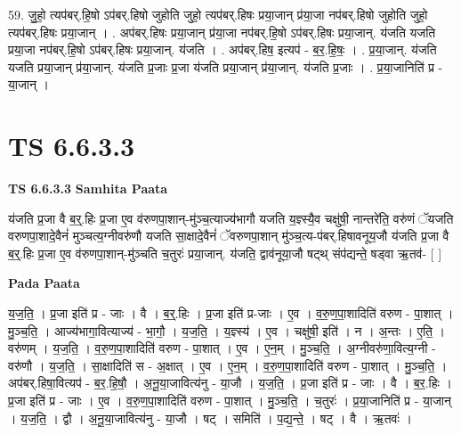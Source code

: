 \documentclass[17pt]{extarticle}
\begin{document}
59. जु॒हो॒ त्यप॑बर्.हि॒षो ऽप॑बर्.हिषो जुहोति जुहो॒ त्यप॑बर्.हिषः प्रया॒जान् प्र॑या॒जा नप॑बर्.हिषो जुहोति जुहो॒ त्यप॑बर्.हिषः प्रया॒जान् । . अप॑बर्.हिषः प्रया॒जान् प्र॑या॒जा नप॑बर्.हि॒षो ऽप॑बर्.हिषः प्रया॒जान्. य॑जति यजति प्रया॒जा नप॑बर्.हि॒षो ऽप॑बर्.हिषः प्रया॒जान्. य॑जति । . अप॑बर्.हिष॒ इत्यप॑ - ब॒र॒.हि॒षः॒ । . प्र॒या॒जान्. य॑जति यजति प्रया॒जान् प्र॑या॒जान्. य॑जति प्र॒जाः प्र॒जा य॑जति प्रया॒जान् प्र॑या॒जान्. य॑जति प्र॒जाः । . प्र॒या॒जानिति॑ प्र - या॒जान् । \newline
\pagebreak
{}

\section{ TS 6.6.3.3 }

\textbf{TS 6.6.3.3 } \newline
\textbf{Samhita Paata} \newline

य॑जति प्र॒जा वै ब॒र्॒.हिः प्र॒जा ए॒व व॑रुणपा॒शान्-मु॑ञ्च॒त्याज्य॑भागौ यजति य॒ज्ञ्स्यै॒व चक्षु॑षी॒ नान्तरे॑ति॒ वरु॑णं ॅयजति वरुणपा॒शादे॒वैनं॑ मुञ्चत्य॒ग्नीवरु॑णौ यजति सा॒क्षादे॒वैनं॑ ॅवरुणपा॒शान् मु॑ञ्च॒त्य-प॑बर्.हिषावनूय॒जौ य॑जति प्र॒जा वै ब॒र्॒.हिः प्र॒जा ए॒व व॑रुणपा॒शान्-मु॑ञ्चति च॒तुरः॑ प्रया॒जान्. य॑जति॒ द्वाव॑नूया॒जौ षट्थ् संप॑द्यन्ते॒ षड्वा ऋ॒तव॑- [  ] \newline

\textbf{Pada Paata} \newline

य॒ज॒ति॒ । प्र॒जा इति॑ प्र - जाः । वै । ब॒र्॒.हिः । प्र॒जा इति॑ प्र-जाः । ए॒व । व॒रु॒ण॒पा॒शादिति॑ वरुण - पा॒शात् । मु॒ञ्च॒ति॒ । आज्य॑भागा॒वित्याज्य॑ - भा॒गौ॒ । य॒ज॒ति॒ । य॒ज्ञ्स्य॑ । ए॒व । चक्षु॑षी॒ इति॑ । न । अ॒न्तः । ए॒ति॒ । वरु॑णम् । य॒ज॒ति॒ । व॒रु॒ण॒पा॒शादिति॑ वरुण - पा॒शात् । ए॒व । ए॒न॒म् । मु॒ञ्च॒ति॒ । अ॒ग्नीवरु॑णा॒वित्य॒ग्नी - वरु॑णौ । य॒ज॒ति॒ । सा॒क्षादिति॑ स - अ॒क्षात् । ए॒व । ए॒न॒म् । व॒रु॒ण॒पा॒शादिति॑ वरुण - पा॒शात् । मु॒ञ्च॒ति॒ । अप॑बर्.हिषा॒वित्यप॑ - ब॒र॒.हि॒षौ॒ । अ॒नू॒या॒जावित्य॑नु - या॒जौ । य॒ज॒ति॒ । प्र॒जा इति॑ प्र - जाः । वै । ब॒र॒.हिः । प्र॒जा इति॑ प्र - जाः । ए॒व । व॒रु॒ण॒पा॒शादिति॑ वरुण - पा॒शात् । मु॒ञ्च॒ति॒ । च॒तुरः॑ । प्र॒या॒जानिति॑ प्र - या॒जान् । य॒ज॒ति॒ । द्वौ । अ॒नू॒या॒जावित्य॑नु - या॒जौ । षट् । समिति॑ । प॒द्य॒न्ते॒ । षट् । वै । ऋ॒तवः॑ ।  \newline
\end{document}
